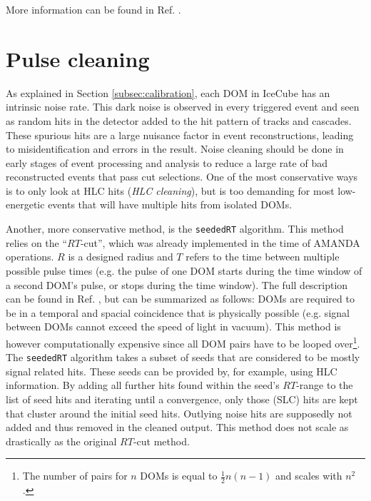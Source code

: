 More information can be found in Ref. \cite{Neunhoffer:2004ha}.

\section{Pulse cleaning}
\label{sec:pulsecleaning}
As explained in Section \ref{subsec:calibration}, each DOM in IceCube has an intrinsic noise rate. This dark noise is observed in every triggered event and seen as random hits in the detector added to the hit pattern of tracks and cascades. These spurious hits are a large nuisance factor in event reconstructions, leading to misidentification and errors in the result. Noise cleaning should be done in early stages of event processing and analysis to reduce a large rate of bad reconstructed events that pass cut selections. One of the most conservative ways is to only look at HLC hits (\textit{HLC cleaning}), but is too demanding for most low-energetic events that will have multiple hits from isolated DOMs. 

Another, more conservative method, is the \texttt{seededRT}  algorithm. This method relies on the ``$RT$-cut'', which was already implemented in the time of AMANDA operations. $R$ is a designed radius and $T$ refers to the time between multiple possible pulse times (e.g. the pulse of one DOM starts during the time window of a second DOM's pulse, or stops during the time window). The full description can be found in Ref. \cite{RTcutwiki}, but can be summarized as follows: DOMs are required to be in a temporal and spacial coincidence that is physically possible (e.g. signal between DOMs cannot exceed the speed of light in vacuum). This method is however computationally expensive since all DOM pairs have to be looped over\footnote{The number of pairs for $n$ DOMs is equal to $\frac{1}{2}n(n-1)$ and scales with $n^2$.}. The \texttt{seededRT} algorithm takes a subset of seeds that are considered to be mostly signal related hits. These seeds can be provided by, for example, using HLC information. By adding all further hits found within the seed's $RT$-range to the list of seed hits and iterating until a convergence, only those (SLC) hits are kept that cluster around the initial seed hits. Outlying noise hits are supposedly not added and thus removed in the cleaned output. This method does not scale as drastically as the original $RT$-cut method.



